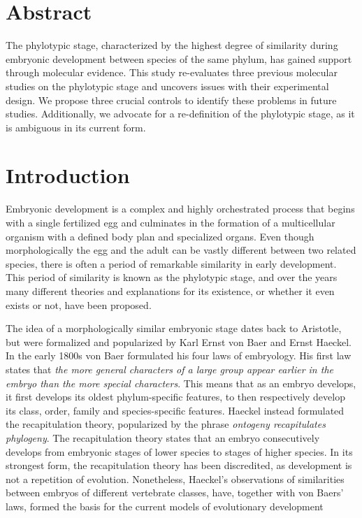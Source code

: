 \section{Abstract}

The phylotypic stage, characterized by the highest degree of similarity during embryonic development between species of the same phylum, has gained support through molecular evidence. This study re-evaluates three previous molecular studies on the phylotypic stage and uncovers issues with their experimental design. We propose three crucial controls to identify these problems in future studies. Additionally, we advocate for a re-definition of the phylotypic stage, as it is ambiguous in its current form.

\section{Introduction}

Embryonic development is a complex and highly orchestrated process that begins with a single fertilized egg and culminates in the formation of a multicellular organism with a defined body plan and specialized organs. Even though morphologically the egg and the adult can be vastly different between two related species, there is often a period of remarkable similarity in early development. This period of similarity is known as the phylotypic stage, and over the years many different theories and explanations for its existence, or whether it even exists or not, have been proposed\cite{Kalinka2012,Irie2014,Drost2017}. 

The idea of a morphologically similar embryonic stage dates back to Aristotle\cite{Aristotle1943}, but were formalized and popularized by Karl Ernst von Baer and Ernst Haeckel. In the early 1800s von Baer formulated his four laws of embryology. His first law states that \textit{the more general characters of a large group appear earlier in the embryo than the more special characters}. This means that as an embryo develops, it first develops its oldest phylum-specific features, to then respectively develop its class, order, family and species-specific features. Haeckel instead formulated the recapitulation theory, popularized by the phrase \textit{ontogeny recapitulates phylogeny}. The recapitulation theory states that an embryo consecutively develops from embryonic stages of lower species to stages of higher species. In its strongest form, the recapitulation theory has been discredited, as development is not a repetition of evolution. Nonetheless, Haeckel's observations of similarities between embryos of different vertebrate classes, have, together with von Baers’ laws, formed the basis for the current models of evolutionary development

